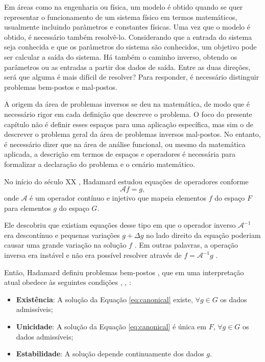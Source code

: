 Em áreas como na engenharia ou física, um modelo é obtido quando se quer representar o funcionamento de um sistema físico em termos matemáticos, usualmente incluindo parâmetros e constantes físicas. Uma vez que o modelo é obtido, é necessário também resolvê-lo. Considerando que a entrada do sistema seja conhecida e que os parâmetros do sistema são conhecidos, um objetivo pode ser calcular a saída do sistema. Há também o caminho inverso, obtendo os parâmetros ou as entradas a partir dos dados de saída. Entre as duas direções, será que alguma é mais difícil de resolver? Para responder, é necessário distinguir problemas bem-postos e mal-postos. 


A origem da área de problemas inversos se deu na matemática, de modo que é necessário rigor em cada definição que descreve o problema. O foco do presente capítulo não é definir esses espaços para uma aplicação específica, mas sim o de descrever o problema geral da área de problemas inversos mal-postos. No entanto, é necessário dizer que na área de análise funcional, ou mesmo da matemática aplicada, a descrição em termos de espaços \cite{Shima2016} e operadores \cite[Seção 6.24]{tarantola2005inverse} é necessária para formalizar a declaração do problema e o cenário matemático. 


No início do século XX \cite{1902hadamard}, Hadamard estudou equações de operadores conforme
\begin{equation}
\mathcal{A} f = g,
\label{eq:canonical}
\end{equation}
onde $\mathcal{A}$ é um operador contínuo e injetivo que mapeia elementos $f$ do espaço $F$ para elementos $g$ do espaço $G$. 

Ele descobriu que existiam equações desse tipo em que o operador inverso $\mathcal{A}^{-1}$ era descontínuo e pequenas variações  $g + \Delta g$ no lado direito da equação poderiam causar uma grande variação na solução $f$ \cite[Subseção 1.3.1]{Vapnik2006}. Em outras palavras, a operação inversa era instável e não era possível resolver através de $f = \mathcal{A}^{-1} g$ \cite{Bell1978}. 

Então, Hadamard definiu problemas bem-postos \cite{1902hadamard}, que em uma interpretação atual obedece às seguintes condições \cite[pág. 2]{hansen2010discrete}, \cite[pág. 1]{Lavrentiev1967}, \cite[págs. 7-8]{tikhonov1977solutions}:
\begin{itemize}
\item \textbf{Existência}: A solução da Equação \eqref{eq:canonical} existe, $ \forall g \in G$ os dados admissíveis; 
\item \textbf{Unicidade}: A solução da Equação \eqref{eq:canonical} é única em $F$, $ \forall g \in G$ os dados admissíveis; 
\item \textbf{Estabilidade}: A solução depende continuamente dos dados $g$. 
\end{itemize}

